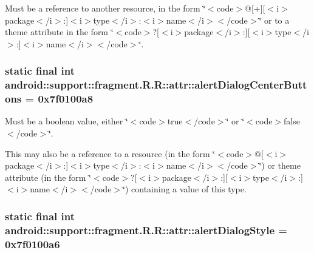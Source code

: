 Must be a reference to another resource, in the form \char`\"{}$<$code$>$@\mbox{[}+\mbox{]}\mbox{[}$<$i$>$package$<$/i$>$:\mbox{]}$<$i$>$type$<$/i$>$:$<$i$>$name$<$/i$>$$<$/code$>$\char`\"{} or to a theme attribute in the form \char`\"{}$<$code$>$?\mbox{[}$<$i$>$package$<$/i$>$:\mbox{]}\mbox{[}$<$i$>$type$<$/i$>$:\mbox{]}$<$i$>$name$<$/i$>$$<$/code$>$\char`\"{}. \hypertarget{classandroid_1_1support_1_1fragment_1_1_r_1_1attr_1f85464e40f6d50040761e8749ed99eb}{
\subsubsection[{alertDialogCenterButtons}]{\setlength{\rightskip}{0pt plus 5cm}static final int android::support::fragment.R.R::attr::alertDialogCenterButtons = 0x7f0100a8}}
\label{classandroid_1_1support_1_1fragment_1_1_r_1_1attr_1f85464e40f6d50040761e8749ed99eb}


Must be a boolean value, either \char`\"{}$<$code$>$true$<$/code$>$\char`\"{} or \char`\"{}$<$code$>$false$<$/code$>$\char`\"{}. 

This may also be a reference to a resource (in the form \char`\"{}$<$code$>$@\mbox{[}$<$i$>$package$<$/i$>$:\mbox{]}$<$i$>$type$<$/i$>$:$<$i$>$name$<$/i$>$$<$/code$>$\char`\"{}) or theme attribute (in the form \char`\"{}$<$code$>$?\mbox{[}$<$i$>$package$<$/i$>$:\mbox{]}\mbox{[}$<$i$>$type$<$/i$>$:\mbox{]}$<$i$>$name$<$/i$>$$<$/code$>$\char`\"{}) containing a value of this type. \hypertarget{classandroid_1_1support_1_1fragment_1_1_r_1_1attr_3106f4dd7f04471940b07632bd44921a}{
\subsubsection[{alertDialogStyle}]{\setlength{\rightskip}{0pt plus 5cm}static final int android::support::fragment.R.R::attr::alertDialogStyle = 0x7f0100a6}}
\label{classandroid_1_1support_1_1fragment_1_1_r_1_1attr_3106f4dd7f04471940b07632bd44921a}


